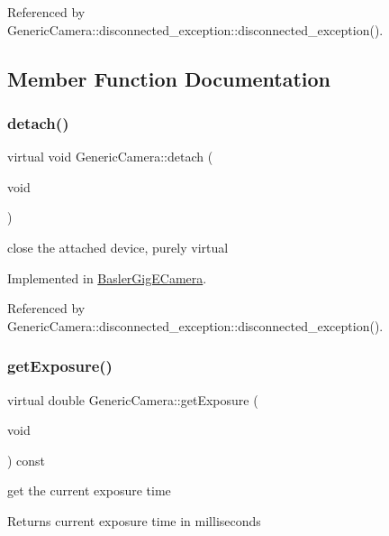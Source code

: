 Referenced by Generic\+Camera\+::disconnected\+\_\+exception\+::disconnected\+\_\+exception().



\subsection{Member Function Documentation}
\mbox{\label{classGenericCamera_a86a91e987d6142e5417b2c07542e0aa4}} 
\subsubsection{\texorpdfstring{detach()}{detach()}}
{\footnotesize\ttfamily virtual void Generic\+Camera\+::detach (\begin{DoxyParamCaption}\item[{void}]{ }\end{DoxyParamCaption})\hspace{0.3cm}{\ttfamily [pure virtual]}}

close the attached device, purely virtual 

Implemented in \hyperlink{classBaslerGigECamera_a13a51a76116cccbd537725457d83254f}{Basler\+Gig\+E\+Camera}.



Referenced by Generic\+Camera\+::disconnected\+\_\+exception\+::disconnected\+\_\+exception().

\mbox{\label{classGenericCamera_ae3fe4b50577c854037b7a77dade27487}} 
\subsubsection{\texorpdfstring{get\+Exposure()}{getExposure()}}
{\footnotesize\ttfamily virtual double Generic\+Camera\+::get\+Exposure (\begin{DoxyParamCaption}\item[{void}]{ }\end{DoxyParamCaption}) const\hspace{0.3cm}{\ttfamily [pure virtual]}}

get the current exposure time \begin{DoxyReturn}{Returns}
current exposure time in milliseconds 
\end{DoxyReturn}


